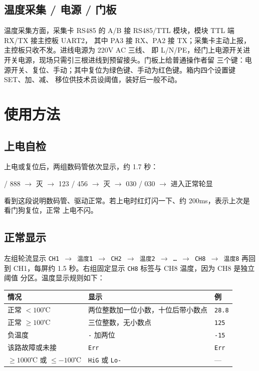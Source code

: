 \documentclass[a4paper,11pt]{ctexart}
\begin{document}
\subsection{温度采集 / 电源 / 门板}
温度采集方面，采集卡 RS485 的 A/B 接 RS485/TTL 模块，模块 TTL 端 RX/TX 接主控板 UART2，
其中 PA3 接 RX、PA2 接 TX；采集卡主动上报，主控板只收不发。进线电源为 220V AC 三线、
即 L/N/PE，经门上电源开关进开关电源，现场只需引三根进线到预留接头。门板上给普通操作者留
三个键：电源开关、复位、手动；其中复位为绿色键、手动为红色键。箱内四个设置键 SET、加、减、
移位供技术员设阈值，装好后一般不动。

\section{使用方法}
\subsection{上电自检}
上电或复位后，两组数码管依次显示，约 1.7 秒：
\begin{center} / 888 $\to$ 灭 $\to$ 123 / 456 $\to$ 灭 $\to$ 030 / 030 $\to$ 进入正常轮显
\end{center}
看到这段说明数码管、驱动正常。若上电时红灯闪一下、约 200ms，表示上次是看门狗复位，正常
上电不闪。

\subsection{正常显示}
左组轮流显示 \texttt{CH1 $\to$ 温度1 $\to$ CH2 $\to$ 温度2 $\to$ \dots{} $\to$ CH8 $\to$ 温度8}
再回到 CH1，每屏约 1.5 秒。右组固定显示 \texttt{CH8} 标签与 CH8 温度，因为 CH8 是独立阈值
分区。温度显示规则如下：
\renewcommand{\arraystretch}{1.3}
\begin{center}
\begin{tabular}{|l|l|l|}
\hline
情况 & 显示 & 例\\
\hline
正常 $<100$℃ & 两位整数加一位小数，十位后带小数点 & \texttt{28.8}\\
\hline
正常 $\ge 100$℃ & 三位整数，无小数点 & \texttt{125}\\
\hline
负温度 & \texttt{-} 加两位 & \texttt{-15}\\
\hline
该路故障或未接 & \texttt{Err} & \texttt{Err}\\
\hline
$\ge 1000$℃ 或 $\le -100$℃ & \texttt{HiG} 或 \texttt{Lo-} & ---\\
\hline
\end{tabular}
\end{center}
\renewcommand{\arraystretch}{1.0}
\end{document}
